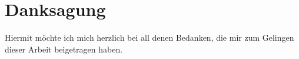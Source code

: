 \chapter*{Danksagung}
Hiermit möchte ich mich herzlich bei all denen Bedanken, die mir zum Gelingen dieser Arbeit beigetragen haben.

\blindtext